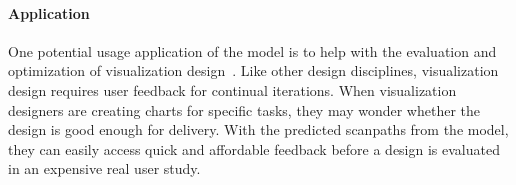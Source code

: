 \paragraph{Application}
One potential usage application of the model is to help with the evaluation and optimization of visualization design~\cite{shin2023perceptual}. Like other design disciplines, visualization design requires user feedback for continual iterations. When visualization designers are creating charts for specific tasks, they may wonder whether the design is good enough for delivery. With the predicted scanpaths from the model, they can easily access quick and affordable feedback before a design is evaluated in an expensive real user study.










